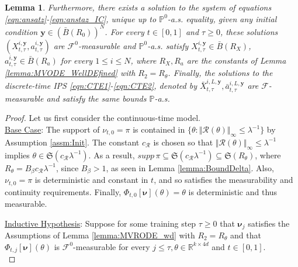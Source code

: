 \documentclass{article}
\newtheorem{lemma}[theorem]{Lemma}
\newcommand{\R}{\mathbb{R}}
\begin{document}
\begin{appendices}
\begin{lemma}
Furthermore, there exists a solution to the system of equations \eqref{eqn:ansatz}-\eqref{eqn:anstaz_IC}, unique up to $\mathbb P^0$-a.s. equality, given any initial condition $\bm y\in (\bar B(R_0))^N$. For every $t\in[0,1]$ and $\tau\ge 0$, these solutions $(X^{i,\bm{y}}_{t,\tau},a^{i,\bm{y}}_{t,\tau})$ are $\mathcal F^0$-measurable and $\mathbb P^0$-a.s. satisfy $X^{i,\bm{y}}_{t,\tau}\in \bar B(R_X)$, $a^{i,\bm{y}}_{t,\tau}\in \bar B(R_a)$ for every $1\le i \le N$, where $R_X,R_a$ are the constants of Lemma \ref{lemma:MVODE_WellDEfined} with $R_2=R_\theta$. Finally, the solutions to the discrete-time IPS \eqref{eqn:CTE1}-\eqref{eqn:CTE2}, denoted by $\bar X^{i,L,\bm{y}}_{t,\tau}, \bar a^{i,L,\bm{y}}_{t,\tau}$ are $\mathcal F$-measurable and satisfy the same bounds $\mathbb P$-a.s.
\end{lemma}
\begin{proof}
Let us first consider the continuous-time model.\\

\underline{Base Case}: The support of $\nu_{t,0}=\pi$ is contained in $\{\theta: \Vert \mathcal R(\theta)\Vert_\infty\le \lambda^{-1}\}$ by Assumption \ref{assm:Init}. The constant $c_\mathcal{R}$ is chosen so that $\Vert \mathcal R(\theta)\Vert_\infty\le \lambda^{-1}$ implies $\theta\in \mathfrak{S}(c_\mathcal R\lambda^{-1})$. As a result,  $supp\, \pi\subseteq\mathfrak{S}(c_\mathcal R\lambda^{-1})\subseteq \mathfrak{S}(R_\theta)$, where $R_\theta =B_\beta c_\mathcal R\lambda^{-1}$, since $B_\beta>1$, as seen in Lemma \ref{lemma:BoundDelta}.  Also, $\nu_{t,0}=\pi$ is deterministic and constant in $t$, and so satisfies the measurability and continuity requirements. Finally, $\Phi_{t,0}[\bm\nu](\theta)=\theta$ is deterministic and thus measurable.

\underline{Inductive Hypothesis}: Suppose for some training step $\tau\ge 0$ that $\bm\nu_j$ satisfies the Assumptions of Lemma \ref{lemma:MVRODE_wd} with $R_2=R_\theta$ and that $ \Phi_{t,j}[\bm\nu](\theta)$ is $\mathcal F^0$-measurable for every $j\le\tau, \theta \in \R^{k\times 4d}$ and $t\in[0,1]$. \\


\end{proof}
\end{appendices}
\end{document}
